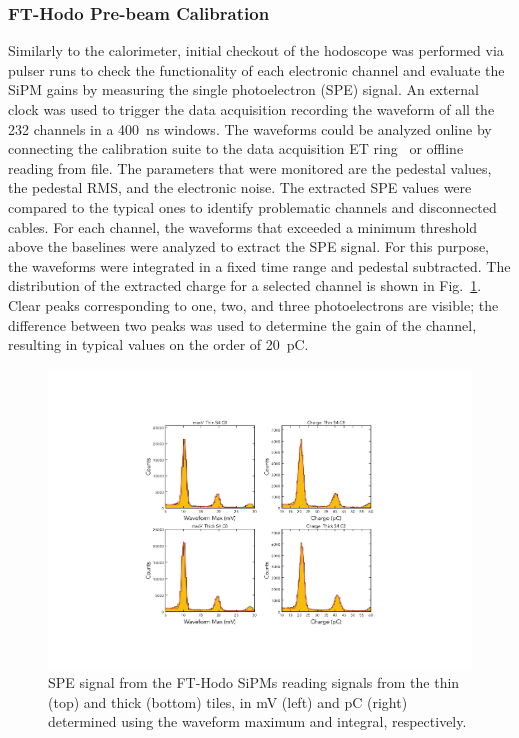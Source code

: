 \subsubsection{FT-Hodo Pre-beam Calibration}

Similarly to the calorimeter, initial checkout of the hodoscope was performed via pulser runs to check the functionality
of each electronic channel and evaluate the SiPM gains by measuring the single photoelectron (SPE) signal. An external
clock was used to trigger the data acquisition recording the waveform of all the 232 channels in a 400~ns windows.
The waveforms could be analyzed online by connecting the calibration suite to the data acquisition ET ring~\cite{daq}
or offline reading from file. The parameters that were monitored are the pedestal values, the pedestal RMS, and the
electronic noise. The extracted SPE values were compared to the typical ones to identify problematic channels and
disconnected cables. For each channel, the waveforms that exceeded a minimum threshold above the baselines were
analyzed to extract the SPE signal. For this purpose, the waveforms were integrated in a fixed time range and pedestal
subtracted. The distribution of the extracted charge for a selected channel is shown in Fig.~\ref{fig:fthodo_spe}.
Clear peaks corresponding to one, two, and three photoelectrons are visible; the difference between two peaks was used
to determine the gain of the channel, resulting in typical values on the order of 20~pC.

\begin{figure}
\includegraphics[width=1.0\columnwidth]{fig/fthodo_spe_2.pdf}
\caption{SPE signal from the FT-Hodo SiPMs reading signals from the thin (top) and thick (bottom) tiles, in mV
  (left) and pC (right) determined using the waveform maximum and integral, respectively.}
\label{fig:fthodo_spe}
\end{figure}

